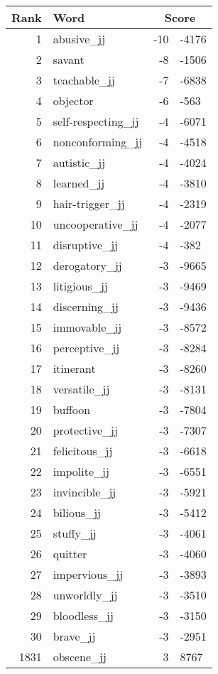 \begin{longtable}[!htbp]{| rlr@{.}l |}
    \hline
    \textbf{Rank} & \textbf{Word} & \multicolumn{2}{c|}{\textbf{Score}} \\
    \hline
    \endhead
    1 & abusive\_jj & -10 & -4176 \\
    2 & savant & -8 & -1506 \\
    3 & teachable\_jj & -7 & -6838 \\
    4 & objector & -6 & -563 \\
    5 & self-respecting\_jj & -4 & -6071 \\
    6 & nonconforming\_jj & -4 & -4518 \\
    7 & autistic\_jj & -4 & -4024 \\
    8 & learned\_jj & -4 & -3810 \\
    9 & hair-trigger\_jj & -4 & -2319 \\
    10 & uncooperative\_jj & -4 & -2077 \\
    11 & disruptive\_jj & -4 & -382 \\
    12 & derogatory\_jj & -3 & -9665 \\
    13 & litigious\_jj & -3 & -9469 \\
    14 & discerning\_jj & -3 & -9436 \\
    15 & immovable\_jj & -3 & -8572 \\
    16 & perceptive\_jj & -3 & -8284 \\
    17 & itinerant & -3 & -8260 \\
    18 & versatile\_jj & -3 & -8131 \\
    19 & buffoon & -3 & -7804 \\
    20 & protective\_jj & -3 & -7307 \\
    21 & felicitous\_jj & -3 & -6618 \\
    22 & impolite\_jj & -3 & -6551 \\
    23 & invincible\_jj & -3 & -5921 \\
    24 & bilious\_jj & -3 & -5412 \\
    25 & stuffy\_jj & -3 & -4061 \\
    26 & quitter & -3 & -4060 \\
    27 & impervious\_jj & -3 & -3893 \\
    28 & unworldly\_jj & -3 & -3510 \\
    29 & bloodless\_jj & -3 & -3150 \\
    30 & brave\_jj & -3 & -2951 \\
    1831 & obscene\_jj & 3 & 8767 \\

\end{longtable}
